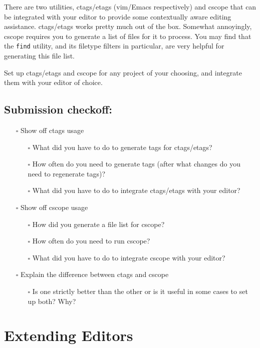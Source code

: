 \documentclass{article}
\begin{document}
There are two utilities, ctags/etags (vim/Emacs respectively) and cscope that
can be integrated with your editor to provide some contextually aware editing
assistance.
ctags/etags works pretty much out of the box. Somewhat annoyingly, cscope
requires you to generate a list of files for it to process. You may find that
the \texttt{find} utility, and its filetype filters in particular, are very
helpful for generating this file list.

Set up ctags/etags and cscope for any project of your choosing, and integrate
them with your editor of choice.

\subsection*{Submission checkoff:}
\begin{itemize}
  \item[$\square$] Show off ctags usage
    \begin{itemize}
      \item[$\square$] What did you have to do to generate tags for ctags/etags?
      \item[$\square$] How often do you need to generate tags (after what
        changes do you need to regenerate tags)?
      \item[$\square$] What did you have to do to integrate ctags/etags with
        your editor?
    \end{itemize}
  \item[$\square$] Show off cscope usage
    \begin{itemize}
      \item[$\square$] How did you generate a file list for cscope?
      \item[$\square$] How often do you need to run cscope?
      \item[$\square$] What did you have to do to integrate cscope with your
        editor?
    \end{itemize}
  \item[$\square$] Explain the difference between ctags and cscope
    \begin{itemize}
      \item[$\square$] Is one strictly better than the other or is it useful
        in some cases to set up both? Why?
    \end{itemize}
\end{itemize}



\newpage
\section{Extending Editors}
\end{document}
